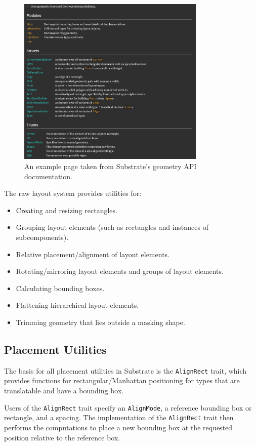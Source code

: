 \begin{figure}[htb] \centering
\includegraphics[width=0.8\textwidth]{figures/subgeom.png}
\caption{
    An example page taken from Substrate's geometry API documentation.
}
\end{figure}


The raw layout system provides utilities for:
\begin{itemize}
\item Creating and resizing rectangles.
\item Grouping layout elements (such as rectangles and instances of subcomponents).
\item Relative placement/alignment of layout elements.
\item Rotating/mirroring layout elements and groups of layout elements.
\item Calculating bounding boxes.
\item Flattening hierarchical layout elements.
\item Trimming geometry that lies outside a masking shape.
\end{itemize}

\subsection{Placement Utilities} \label{sec:placement-utilities}

The basis for all placement utilities in Substrate is the \verb|AlignRect| trait,
which provides functions for rectangular/Manhattan positioning for types
that are translatable and have a bounding box.

Users of the \verb|AlignRect| trait specify an \verb|AlignMode|, a reference bounding box or rectangle,
and a spacing. The implementation of the \verb|AlignRect| trait then performs the computations to place
a new bounding box at the requested position relative to the reference box.

